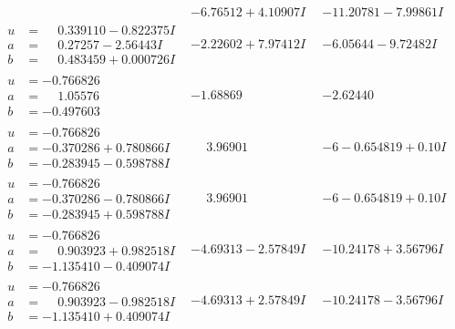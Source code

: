 \documentclass[1p]{elsarticle_modified}
\theoremstyle{definition}
\begin{document}
$$\begin{array}{c|c|c}
 & -6.76512 + 4.10907 I & -11.20781 - 7.99861 I \\ \hline\begin{aligned}
u &= \phantom{-}0.339110 - 0.822375 I \\
a &= \phantom{-}0.27257 - 2.56443 I \\
b &= \phantom{-}0.483459 + 0.000726 I\end{aligned}
 & -2.22602 + 7.97412 I & -6.05644 - 9.72482 I \\ \hline\begin{aligned}
u &= -0.766826\phantom{ +0.000000I} \\
a &= \phantom{-}1.05576\phantom{ +0.000000I} \\
b &= -0.497603\phantom{ +0.000000I}\end{aligned}
 & -1.68869\phantom{ +0.000000I} & -2.62440\phantom{ +0.000000I} \\ \hline\begin{aligned}
u &= -0.766826\phantom{ +0.000000I} \\
a &= -0.370286 + 0.780866 I \\
b &= -0.283945 - 0.598788 I\end{aligned}
 & \phantom{-}3.96901\phantom{ +0.000000I} &                  -6
-0.654819 + 0. 10   I\phantom{ +0.000000I} \\ \hline\begin{aligned}
u &= -0.766826\phantom{ +0.000000I} \\
a &= -0.370286 - 0.780866 I \\
b &= -0.283945 + 0.598788 I\end{aligned}
 & \phantom{-}3.96901\phantom{ +0.000000I} &                  -6
-0.654819 + 0. 10   I\phantom{ +0.000000I} \\ \hline\begin{aligned}
u &= -0.766826\phantom{ +0.000000I} \\
a &= \phantom{-}0.903923 + 0.982518 I \\
b &= -1.135410 - 0.409074 I\end{aligned}
 & -4.69313 - 2.57849 I & -10.24178 + 3.56796 I \\ \hline\begin{aligned}
u &= -0.766826\phantom{ +0.000000I} \\
a &= \phantom{-}0.903923 - 0.982518 I \\
b &= -1.135410 + 0.409074 I\end{aligned}
 & -4.69313 + 2.57849 I & -10.24178 - 3.56796 I \\ \hline\begin{aligned}

\end{aligned}
\end{array}$$
\end{document}
